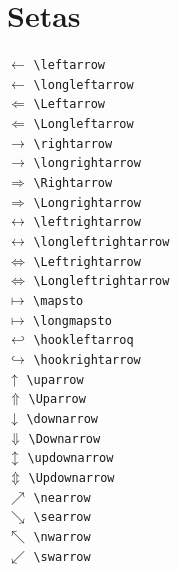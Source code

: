 \documentclass[xindy,draft]{fei}
\begin{document}
\section{Setas}
\begin{multicols}{2}
\noindent
\(\leftarrow\) \verb+\leftarrow+\\
\(\longleftarrow\) \verb+\longleftarrow+\\
\(\Leftarrow\) \verb+\Leftarrow+\\
\(\Longleftarrow\) \verb+\Longleftarrow+\\
\(\rightarrow\) \verb+\rightarrow+\\
\(\longrightarrow\) \verb+\longrightarrow+\\
\(\Rightarrow\) \verb+\Rightarrow+\\
\(\Longrightarrow\) \verb+\Longrightarrow+\\
\(\leftrightarrow\) \verb+\leftrightarrow+\\
\(\longleftrightarrow\) \verb+\longleftrightarrow+\\
\(\Leftrightarrow\) \verb+\Leftrightarrow+\\
\(\Longleftrightarrow\) \verb+\Longleftrightarrow+\\
\(\mapsto\) \verb+\mapsto+\\
\(\longmapsto\) \verb+\longmapsto+\\
\(\hookleftarrow\) \verb+\hookleftarroq+\\
\(\hookrightarrow\) \verb+\hookrightarrow+\\
\(\uparrow\) \verb+\uparrow+\\
\(\Uparrow\) \verb+\Uparrow+\\
\(\downarrow\) \verb+\downarrow+\\
\(\Downarrow\) \verb+\Downarrow+\\
\(\updownarrow\) \verb+\updownarrow+\\
\(\Updownarrow\) \verb+\Updownarrow+\\
\(\nearrow\) \verb+\nearrow+\\
\(\searrow\) \verb+\searrow+\\
\(\nwarrow\) \verb+\nwarrow+\\
\(\swarrow\) \verb+\swarrow+\\
\end{multicols}

\indice
	
\end{document}

